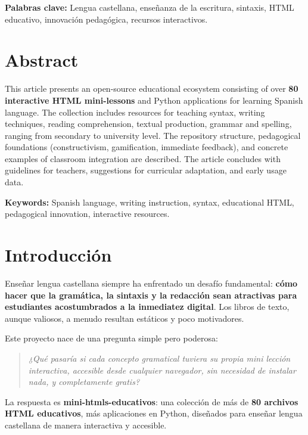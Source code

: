 \documentclass[12pt,spanish]{article}
\begin{document}
\textbf{Palabras clave:} Lengua castellana, enseñanza de la escritura, sintaxis, HTML educativo, innovación pedagógica, recursos interactivos.

\newpage

\section*{Abstract}

This article presents an open-source educational ecosystem consisting of over \textbf{80 interactive HTML mini-lessons} and Python applications for learning Spanish language. The collection includes resources for teaching syntax, writing techniques, reading comprehension, textual production, grammar and spelling, ranging from secondary to university level. The repository structure, pedagogical foundations (constructivism, gamification, immediate feedback), and concrete examples of classroom integration are described. The article concludes with guidelines for teachers, suggestions for curricular adaptation, and early usage data.

\textbf{Keywords:} Spanish language, writing instruction, syntax, educational HTML, pedagogical innovation, interactive resources.

\newpage

\tableofcontents
\newpage

\section{Introducción}

Enseñar lengua castellana siempre ha enfrentado un desafío fundamental: \textbf{cómo hacer que la gramática, la sintaxis y la redacción sean atractivas para estudiantes acostumbrados a la inmediatez digital}. Los libros de texto, aunque valiosos, a menudo resultan estáticos y poco motivadores.

Este proyecto nace de una pregunta simple pero poderosa:

\begin{quote}
\textit{¿Qué pasaría si cada concepto gramatical tuviera su propia mini lección interactiva, accesible desde cualquier navegador, sin necesidad de instalar nada, y completamente gratis?}
\end{quote}

La respuesta es \textbf{mini-htmls-educativos}: una colección de más de \textbf{80 archivos HTML educativos}, más aplicaciones en Python, diseñados para enseñar lengua castellana de manera interactiva y accesible.
\end{document}
